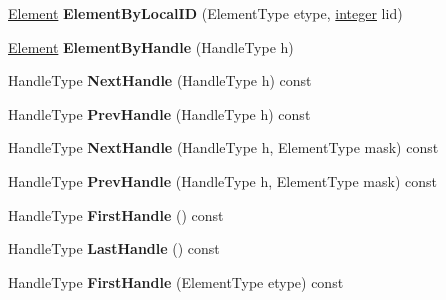 \begin{DoxyCompactItemize}
\item 
\hypertarget{classINMOST_1_1Mesh_aa9d09a55b27ac2f0f500400648ca38ee}{\hyperlink{classINMOST_1_1Element}{Element} {\bfseries Element\-By\-Local\-I\-D} (Element\-Type etype, \hyperlink{classINMOST_1_1Storage_aec96942bc647417a801e2895b45964d2}{integer} lid)}\label{classINMOST_1_1Mesh_aa9d09a55b27ac2f0f500400648ca38ee}

\item 
\hypertarget{classINMOST_1_1Mesh_a2304ca5cb8a374ecc6b0b5f0f900e349}{\hyperlink{classINMOST_1_1Element}{Element} {\bfseries Element\-By\-Handle} (Handle\-Type h)}\label{classINMOST_1_1Mesh_a2304ca5cb8a374ecc6b0b5f0f900e349}

\item 
\hypertarget{classINMOST_1_1Mesh_ad2584a6bb66add033560e495dbfba53f}{Handle\-Type {\bfseries Next\-Handle} (Handle\-Type h) const }\label{classINMOST_1_1Mesh_ad2584a6bb66add033560e495dbfba53f}

\item 
\hypertarget{classINMOST_1_1Mesh_acf6fc997d82528c82499344d358df8d0}{Handle\-Type {\bfseries Prev\-Handle} (Handle\-Type h) const }\label{classINMOST_1_1Mesh_acf6fc997d82528c82499344d358df8d0}

\item 
\hypertarget{classINMOST_1_1Mesh_a85ef45248dfb8b5126ca81a7bcd409f2}{Handle\-Type {\bfseries Next\-Handle} (Handle\-Type h, Element\-Type mask) const }\label{classINMOST_1_1Mesh_a85ef45248dfb8b5126ca81a7bcd409f2}

\item 
\hypertarget{classINMOST_1_1Mesh_a29b510ecffabe4242b3be375b69a4575}{Handle\-Type {\bfseries Prev\-Handle} (Handle\-Type h, Element\-Type mask) const }\label{classINMOST_1_1Mesh_a29b510ecffabe4242b3be375b69a4575}

\item 
\hypertarget{classINMOST_1_1Mesh_a4f26f7a8fbf7bf0a104b79f2433334a2}{Handle\-Type {\bfseries First\-Handle} () const }\label{classINMOST_1_1Mesh_a4f26f7a8fbf7bf0a104b79f2433334a2}

\item 
\hypertarget{classINMOST_1_1Mesh_a863be497f888170153331f74fae93e06}{Handle\-Type {\bfseries Last\-Handle} () const }\label{classINMOST_1_1Mesh_a863be497f888170153331f74fae93e06}

\item 
\hypertarget{classINMOST_1_1Mesh_a9429b9ce591e027f150443891b23e498}{Handle\-Type {\bfseries First\-Handle} (Element\-Type etype) const }\label{classINMOST_1_1Mesh_a9429b9ce591e027f150443891b23e498}


\end{DoxyCompactItemize}
